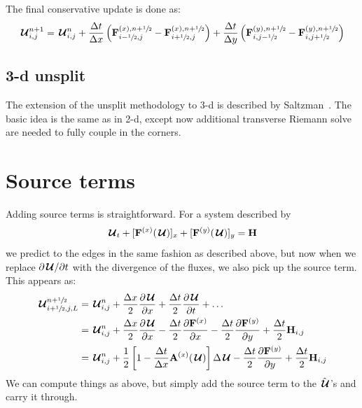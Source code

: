 The final conservative update is done as:
\begin{equation}
{\,\boldsymbol{\mathcal{U}}}^{n+1}_{i,j} = {\,\boldsymbol{\mathcal{U}}}^n_{i,j}
   + \frac{\Delta t}{\Delta x} \left ( {\bf F}^{(x),n+{\sfrac{1}{2}}}_{i-{\sfrac{1}{2}},j} - {\bf F}^{(x),n+{\sfrac{1}{2}}}_{i+{\sfrac{1}{2}},j} \right )
   + \frac{\Delta t}{\Delta y} \left ( {\bf F}^{(y),n+{\sfrac{1}{2}}}_{i,j-{\sfrac{1}{2}}} - {\bf F}^{(y),n+{\sfrac{1}{2}}}_{i,j+{\sfrac{1}{2}}} \right )
\end{equation}



\subsection{3-d unsplit}

The extension of the unsplit methodology to 3-d is described by
Saltzman~\cite{saltzman:1994}.  The basic idea is the same as in 2-d,
except now additional transverse Riemann solve are needed to fully
couple in the corners.


\section{Source terms}
\label{euler:sec:sourceterms}

Adding source terms is straightforward.  For
a system described by
\begin{equation}
{\,\boldsymbol{\mathcal{U}}}_t + [{\bf F}^{(x)}({\,\boldsymbol{\mathcal{U}}})]_x + [{\bf F}^{(y)}({\,\boldsymbol{\mathcal{U}}})]_y = {\bf H}
\end{equation}
we predict to the edges in the same fashion as described above, but now
when we replace $\partial {\,\boldsymbol{\mathcal{U}}}/\partial t$ with the divergence of the
fluxes, we also pick up the source term.  This appears as:
\begin{align}
{\,\boldsymbol{\mathcal{U}}}_{i+{\sfrac{1}{2}},j,L}^{n+{\sfrac{1}{2}}} &= {\,\boldsymbol{\mathcal{U}}}_{i,j}^n
            + \frac{\Delta x}{2} \frac{\partial {\,\boldsymbol{\mathcal{U}}}}{\partial x}
            + \frac{\Delta t}{2} \frac{\partial {\,\boldsymbol{\mathcal{U}}}}{\partial t} + \ldots \\
&= {\,\boldsymbol{\mathcal{U}}}_{i,j}^n + \frac{\Delta x}{2} \frac{\partial {\,\boldsymbol{\mathcal{U}}}}{\partial x}
              - \frac{\Delta t}{2} \frac{\partial {\bf F}^{(x)}}{\partial x}
              - \frac{\Delta t}{2} \frac{\partial {\bf F}^{(y)}}{\partial y}
              + \frac{\Delta t}{2} {\bf H}_{i,j} \\
&= {\,\boldsymbol{\mathcal{U}}}_{i,j}^n
 + \frac{1}{2} \left [1 -\frac{\Delta t}{\Delta x} {\bf A}^{(x)}({\,\boldsymbol{\mathcal{U}}})\right ] \Delta {\,\boldsymbol{\mathcal{U}}}
 - \frac{\Delta t}{2} \frac{\partial {\bf F}^{(y)}}{\partial y}
 + \frac{\Delta t}{2} {\bf H}_{i,j}
  \label{eq:Utaylorstatesource}
\end{align}
We can compute things as above, but simply add the source term to the
$\hat{{\,\boldsymbol{\mathcal{U}}}}$'s and carry it through.


